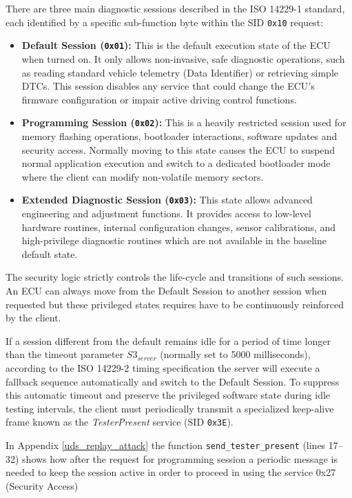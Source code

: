 There are three main diagnostic sessions described in the ISO 14229\textnormal{-}1 standard, each identified by a specific sub-function byte within the \gls{SID} \texttt{0x10} request:

\begin{itemize}
    \item \textbf{Default Session (\texttt{0\textnormal{x}01}):} This is the default execution state of the \gls{ECU} when turned on. It only allows non-invasive, safe diagnostic operations, such as reading standard vehicle telemetry (Data Identifier) or retrieving simple \glspl{DTC}. This session disables any service that could change the \gls{ECU}'s firmware configuration or impair active driving control functions.
    \item \textbf{Programming Session (\texttt{0\textnormal{x}02}):} This is a heavily restricted session used for memory flashing operations, bootloader interactions, software updates and security access. Normally moving to this state causes the \gls{ECU} to suspend normal application execution and switch to a dedicated bootloader mode where the client can modify non-volatile memory sectors.
    \item \textbf{Extended Diagnostic Session (\texttt{0\textnormal{x}03}):} This state allows advanced engineering and adjustment functions. It provides access to low-level hardware routines, internal configuration changes, sensor calibrations, and high-privilege diagnostic routines which are not available in the baseline default state.
\end{itemize}

The security logic strictly controls the life-cycle and transitions of such sessions. An \gls{ECU} can always move from the Default Session to another session when requested but these privileged states requires have to be continuously reinforced by the client.

If a session different from the default remains idle for a period of time longer than the timeout parameter $S3_{server}$ (normally set to 5000 milliseconds), according to the ISO 14229-2 timing specification the server will execute a fallback sequence automatically and switch to the Default Session. To suppress this automatic timeout and preserve the privileged software state during idle testing intervals, the client must periodically transmit a specialized keep-alive frame known as the \textit{TesterPresent} service (SID \texttt{0x3E}).

In Appendix \ref{uds_replay_attack} the function \texttt{send\_tester\_present} (lines 17--32) shows how after the request for programming session a periodic message is needed to keep the session active in order to proceed in using the service 0x27 (Security Access)

